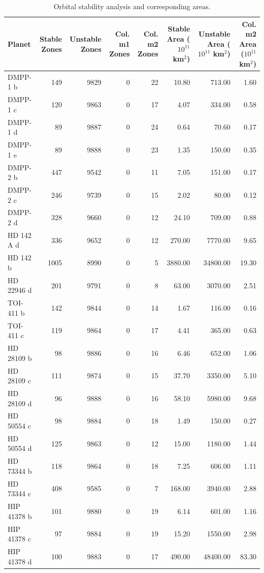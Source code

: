 \begin{table}
\caption{Orbital stability analysis and corresponding areas.}
\label{tab:stability_areas}
\begin{tabular}{lrrrrrrr}
\toprule
Planet & Stable Zones & Unstable Zones & Col. m1 Zones & Col. m2 Zones & Stable Area ($10^{11}$ km$^2$) & Unstable Area ($10^{11}$ km$^2$) & Col. m2 Area ($10^{11}$ km$^2$) \\
\midrule
DMPP-1 b & 149 & 9829 & 0 & 22 & 10.80 & 713.00 & 1.60 \\
DMPP-1 c & 120 & 9863 & 0 & 17 & 4.07 & 334.00 & 0.58 \\
DMPP-1 d & 89 & 9887 & 0 & 24 & 0.64 & 70.60 & 0.17 \\
DMPP-1 e & 89 & 9888 & 0 & 23 & 1.35 & 150.00 & 0.35 \\
DMPP-2 b & 447 & 9542 & 0 & 11 & 7.05 & 151.00 & 0.17 \\
DMPP-2 c & 246 & 9739 & 0 & 15 & 2.02 & 80.00 & 0.12 \\
DMPP-2 d & 328 & 9660 & 0 & 12 & 24.10 & 709.00 & 0.88 \\
HD 142 A d & 336 & 9652 & 0 & 12 & 270.00 & 7770.00 & 9.65 \\
HD 142 b & 1005 & 8990 & 0 & 5 & 3880.00 & 34800.00 & 19.30 \\
HD 22946 d & 201 & 9791 & 0 & 8 & 63.00 & 3070.00 & 2.51 \\
TOI-411 b & 142 & 9844 & 0 & 14 & 1.67 & 116.00 & 0.16 \\
TOI-411 c & 119 & 9864 & 0 & 17 & 4.41 & 365.00 & 0.63 \\
HD 28109 b & 98 & 9886 & 0 & 16 & 6.46 & 652.00 & 1.06 \\
HD 28109 c & 111 & 9874 & 0 & 15 & 37.70 & 3350.00 & 5.10 \\
HD 28109 d & 96 & 9888 & 0 & 16 & 58.10 & 5980.00 & 9.68 \\
HD 50554 c & 98 & 9884 & 0 & 18 & 1.49 & 150.00 & 0.27 \\
HD 50554 d & 125 & 9863 & 0 & 12 & 15.00 & 1180.00 & 1.44 \\
HD 73344 b & 118 & 9864 & 0 & 18 & 7.25 & 606.00 & 1.11 \\
HD 73344 c & 408 & 9585 & 0 & 7 & 168.00 & 3940.00 & 2.88 \\
HIP 41378 b & 101 & 9880 & 0 & 19 & 6.14 & 601.00 & 1.16 \\
HIP 41378 c & 97 & 9884 & 0 & 19 & 15.20 & 1550.00 & 2.98 \\
HIP 41378 d & 100 & 9883 & 0 & 17 & 490.00 & 48400.00 & 83.30 \\

\end{tabular}
\end{table}
